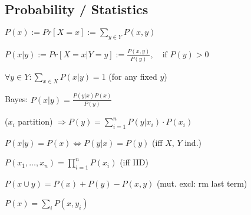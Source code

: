 \subsection*{Probability / Statistics}
\begin{inparaitem}
	\item $P(x) := Pr[X = x] := \sum_{y \in Y} P(x, y)$
	\item $P(x|y) := Pr[X = x | Y = y] := \frac{P(x,y)}{P(y)},\quad \text{if } P(y) > 0$
	\item $\forall y \in Y: \sum_{x \in X} P(x|y) = 1$ (for any fixed $y$)
	\item Bayes: $P(x|y) = \frac{P(y|x)P(x)}{P(y)}$
	\item ($x_i$ partition) $\Rightarrow P(y) = \sum_{i=1}^n P(y|x_i)\cdot P(x_i)$
	\item $P(x|y) = P(x) \Leftrightarrow P(y|x) = P(y)$ (iff $X$, $Y$ ind.)
	\item $P(x_1, \ldots, x_n) = \prod_{i=1}^n P(x_i)$ (iff IID)
	\item $P(x \cup y)=P(x)+P(y)-P(x,y)$ (mut. excl: rm last term)
	\item $P(x)=\sum_i P(x,y_i)$
\end{inparaitem}